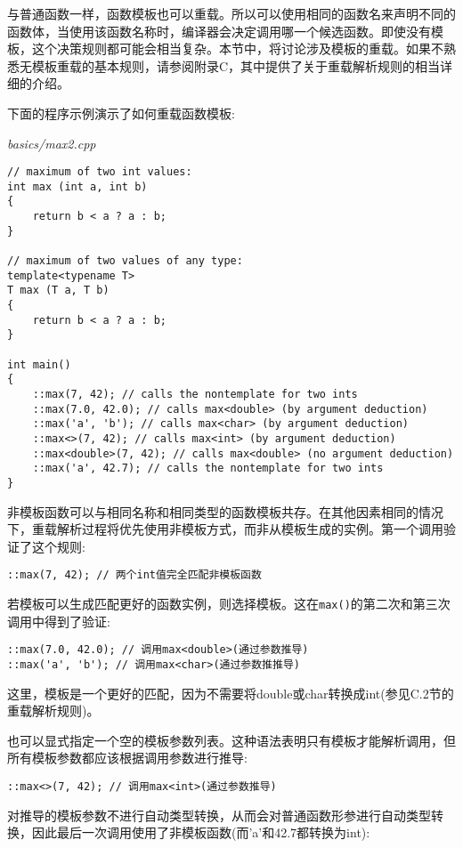 与普通函数一样，函数模板也可以重载。所以可以使用相同的函数名来声明不同的函数体，当使用该函数名称时，编译器会决定调用哪一个候选函数。即使没有模板，这个决策规则都可能会相当复杂。本节中，将讨论涉及模板的重载。如果不熟悉无模板重载的基本规则，请参阅附录C，其中提供了关于重载解析规则的相当详细的介绍。

下面的程序示例演示了如何重载函数模板:

\noindent
\textit{basics/max2.cpp}
\begin{lstlisting}[style=styleCXX]
// maximum of two int values:
int max (int a, int b)
{
	return b < a ? a : b;
}

// maximum of two values of any type:
template<typename T>
T max (T a, T b)
{
	return b < a ? a : b;
}

int main()
{
	::max(7, 42); // calls the nontemplate for two ints
	::max(7.0, 42.0); // calls max<double> (by argument deduction)
	::max('a', 'b'); // calls max<char> (by argument deduction)
	::max<>(7, 42); // calls max<int> (by argument deduction)
	::max<double>(7, 42); // calls max<double> (no argument deduction)
	::max('a', 42.7); // calls the nontemplate for two ints
}
\end{lstlisting}

非模板函数可以与相同名称和相同类型的函数模板共存。在其他因素相同的情况下，重载解析过程将优先使用非模板方式，而非从模板生成的实例。第一个调用验证了这个规则:

\begin{lstlisting}[style=styleCXX]
::max(7, 42); // 两个int值完全匹配非模板函数
\end{lstlisting}

若模板可以生成匹配更好的函数实例，则选择模板。这在\texttt{max()}的第二次和第三次调用中得到了验证:

\begin{lstlisting}[style=styleCXX]
::max(7.0, 42.0); // 调用max<double>(通过参数推导)
::max('a', 'b'); // 调用max<char>(通过参数推推导)
\end{lstlisting}

这里，模板是一个更好的匹配，因为不需要将double或char转换成int(参见C.2节的重载解析规则)。

也可以显式指定一个空的模板参数列表。这种语法表明只有模板才能解析调用，但所有模板参数都应该根据调用参数进行推导:

\begin{lstlisting}[style=styleCXX]
::max<>(7, 42); // 调用max<int>(通过参数推导)
\end{lstlisting}

对推导的模板参数不进行自动类型转换，从而会对普通函数形参进行自动类型转换，因此最后一次调用使用了非模板函数(而'a'和42.7都转换为int):

